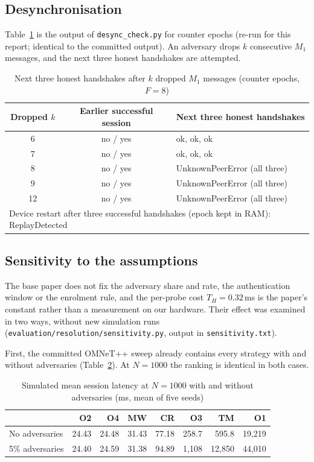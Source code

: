 \subsection*{Desynchronisation}
Table~\ref{tab:desync} is the output of \texttt{desync\_check.py} for counter epochs (re-run for this report; identical to the committed output). An adversary drops $k$ consecutive $M_1$ messages, and the next three honest handshakes are attempted.

\begin{table}[H]
\centering
\caption{Next three honest handshakes after $k$ dropped $M_1$ messages (counter epochs, $F=8$)}
\label{tab:desync}
\small
\begin{tabular}{|c|c|l|}
\hline
\textbf{Dropped $k$} & \textbf{Earlier successful session} & \textbf{Next three honest handshakes}\\ \hline
6 & no / yes & ok, ok, ok\\ \hline
7 & no / yes & ok, ok, ok\\ \hline
8 & no / yes & UnknownPeerError (all three)\\ \hline
9 & no / yes & UnknownPeerError (all three)\\ \hline
12 & no / yes & UnknownPeerError (all three)\\ \hline
\multicolumn{3}{|l|}{Device restart after three successful handshakes (epoch kept in RAM): ReplayDetected}\\ \hline
\end{tabular}
\end{table}

\subsection*{Sensitivity to the assumptions}
The base paper does not fix the adversary share and rate, the authentication window or the enrolment rule, and the per-probe cost $T_H=0.32$\,ms is the paper's constant rather than a measurement on our hardware. Their effect was examined in two ways, without new simulation runs (\texttt{evaluation/resolution/sensitivity.py}, output in \texttt{sensitivity.txt}).

First, the committed OMNeT++ sweep already contains every strategy with and without adversaries (Table~\ref{tab:advcmp}). At $N=1000$ the ranking is identical in both cases.

\begin{table}[H]
\centering
\caption{Simulated mean session latency at $N=1000$ with and without adversaries (ms, mean of five seeds)}
\label{tab:advcmp}
\small
\begin{tabular}{|l|r|r|r|r|r|r|r|}
\hline
 & \textbf{O2} & \textbf{O4} & \textbf{MW} & \textbf{CR} & \textbf{O3} & \textbf{TM} & \textbf{O1}\\ \hline
No adversaries & 24.43 & 24.48 & 31.43 & 77.18 & 258.7 & 595.8 & 19,219\\ \hline
5\% adversaries & 24.40 & 24.59 & 31.38 & 94.89 & 1,108 & 12,850 & 44,010\\ \hline
\end{tabular}
\end{table}

